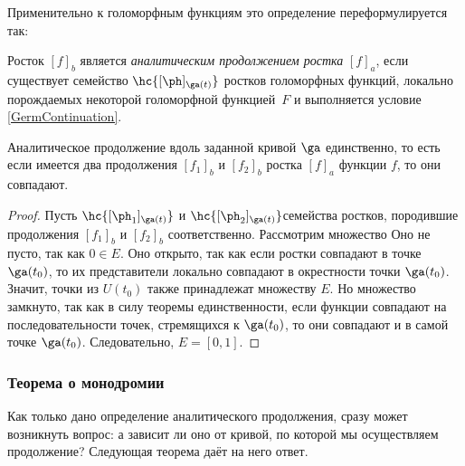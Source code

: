 \documentclass[a4paper]{article}
\begin{document}
Применительно к голоморфным функциям это определение переформулируется так:

\begin{df}
Росток $[f]_b$ является \emph{аналитическим продолжением ростка} $[f]_a$, если существует семейство
$\hc{[\ph]_{\ga(t)}}$ ростков голоморфных функций, локально порождаемых некоторой голоморфной функцией~$F$
и выполняется условие \eqref{GermContinuation}.
\end{df}

\begin{stm}
Аналитическое продолжение вдоль заданной кривой $\ga$ единственно, то есть если имеется два продолжения $[f_1]_b$ и $[f_2]_b$
ростка $[f]_a$ функции $f$, то они совпадают.
\end{stm}
\begin{proof}
Пусть $\hc{[\ph_1]_{\ga(t)}}$ и $\hc{[\ph_2]_{\ga(t)}}$\т семейства ростков, породившие продолжения $[f_1]_b$ и $[f_2]_b$
соответственно. Рассмотрим множество
Оно не пусто, так как $0\in E$. Оно открыто, так как если ростки совпадают в точке $\ga(t_0)$, то их представители локально совпадают в окрестности
точки $\ga(t_0)$. Значит, точки из $U(t_0)$ также принадлежат множеству $E$. Но множество замкнуто, так как в силу теоремы
единственности, если функции совпадают на последовательности точек, стремящихся к $\ga(t_0)$, то они совпадают и в самой точке
$\ga(t_0)$. Следовательно, $E=[0,1]$.
\end{proof}

\subsubsection{Теорема о монодромии}

Как только дано определение аналитического продолжения, сразу может возникнуть вопрос: а зависит ли оно от кривой,
по которой мы осуществляем продолжение? Следующая теорема даёт на него ответ.
\end{document}
